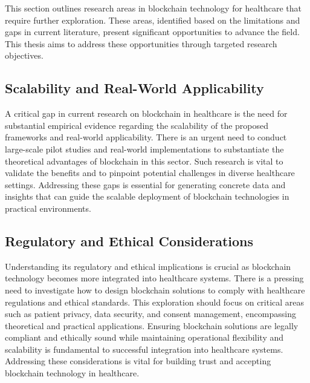 \documentclass[cic,tc,english]{iiufrgs}
\begin{document}
        This section outlines research areas in blockchain technology for healthcare that require further exploration. These areas, identified based on the limitations and gaps in current literature, present significant opportunities to advance the field. This thesis aims to address these opportunities through targeted research objectives.

        \subsection{Scalability and Real-World Applicability} 
            A critical gap in current research on blockchain in healthcare is the need for substantial empirical evidence regarding the scalability of the proposed frameworks and real-world applicability. There is an urgent need to conduct large-scale pilot studies and real-world implementations to substantiate the theoretical advantages of blockchain in this sector. Such research is vital to validate the benefits and to pinpoint potential challenges in diverse healthcare settings. Addressing these gaps is essential for generating concrete data and insights that can guide the scalable deployment of blockchain technologies in practical environments.

        \subsection{Regulatory and Ethical Considerations} 
            Understanding its regulatory and ethical implications is crucial as blockchain technology becomes more integrated into healthcare systems. There is a pressing need to investigate how to design blockchain solutions to comply with healthcare regulations and ethical standards. This exploration should focus on critical areas such as patient privacy, data security, and consent management, encompassing theoretical and practical applications. Ensuring blockchain solutions are legally compliant and ethically sound while maintaining operational flexibility and scalability is fundamental to successful integration into healthcare systems. Addressing these considerations is vital for building trust and accepting blockchain technology in healthcare.
\end{document}
